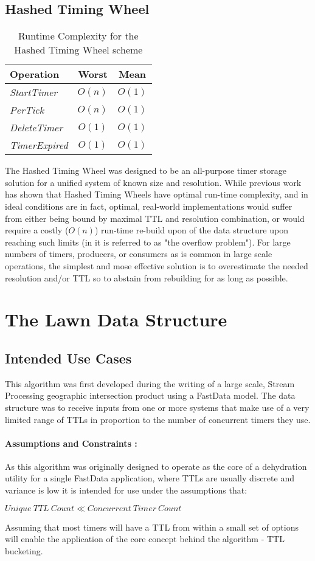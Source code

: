 \documentclass[acmsmall]{acmart} %
\newcommand{\advcomplexity}[9]{
\begin{table}[h!]
	\begin{center}
		\begin{tabular}{l|c|c}
			\textbf{Operation} & \textbf{Worst} & \textbf{Mean} \\
			\hline
			\textit{StartTimer} & $O(#1)$ & $O(#2)$ \\
			\textit{PerTick} & $O(#3)$ & $O(#4)$ \\
			\textit{DeleteTimer} & $O(#5)$ & $O(#6)$ \\
			\textit{TimerExpired} & $O(#7)$ & $O(#8)$ \\
		\end{tabular}
		\caption{Runtime Complexity for #9 scheme}
	\end{center}
\end{table}
}
\begin{document}
\subsection{Hashed Timing Wheel}
\advcomplexity{n}{1}{n}{1}{1}{1}{1}{1}{the Hashed Timing Wheel}
The Hashed Timing Wheel was designed to be an all-purpose timer storage solution for a unified system of known size and resolution\cite{TW87}\cite{TW}\cite{TWI}. While previous work has shown that Hashed Timing Wheels have optimal run-time complexity, and in ideal conditions are in fact, optimal, real-world implementations would suffer from either being bound by maximal TTL and resolution combination, or would require a costly ($O(n)$) run-time re-build upon of the data structure upon reaching such limits (in \cite{CQ} it is referred to as "the overflow problem"). For large numbers of timers, producers, or consumers as is common in large scale operations, the simplest and mose effective solution is to overestimate the needed resolution and/or TTL so to abstain from rebuilding for as long as possible. 

\section{The Lawn Data Structure}
 
\subsection{Intended Use Cases}

This algorithm was first developed during the writing of a large scale, Stream Processing geographic intersection product\cite{VUSR} using a FastData\cite{GP} model. The data structure was to receive inputs from one or more systems that make use of a very limited range of TTLs in proportion to the number of concurrent timers they use. 

\paragraph{Assumptions and Constraints :}
As this algorithm was originally designed to operate as the core of a dehydration utility for a single FastData application, where TTLs are usually discrete and variance is low it is intended for use under the assumptions that: 
\begin{center}
	$ Unique\ TTL\ Count \ll Concurrent\ Timer\ Count $
\end{center}
Assuming that most timers will have a TTL from within a small set of options will enable the application of the core concept behind the algorithm - TTL bucketing. 
\end{document}
